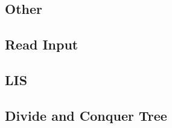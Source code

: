 \documentclass[a4paper,landscape]{article}
\begin{document}
\begin{multicols}{2}
\section{Other}
\subsection{Read Input}
	
\subsection{LIS}
	
\subsection{Divide and Conquer Tree}
	

\end{multicols}
\end{document}
